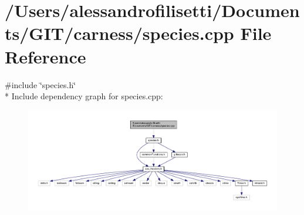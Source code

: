 \hypertarget{a00079}{\section{/\+Users/alessandrofilisetti/\+Documents/\+G\+I\+T/carness/species.cpp File Reference}
\label{a00079}
}
{\ttfamily \#include \char`\"{}species.\+h\char`\"{}}\\*
Include dependency graph for species.\+cpp\+:\nopagebreak
\begin{figure}[H]
\begin{center}
\leavevmode
\includegraphics[width=350pt]{a00203}
\end{center}
\end{figure}
